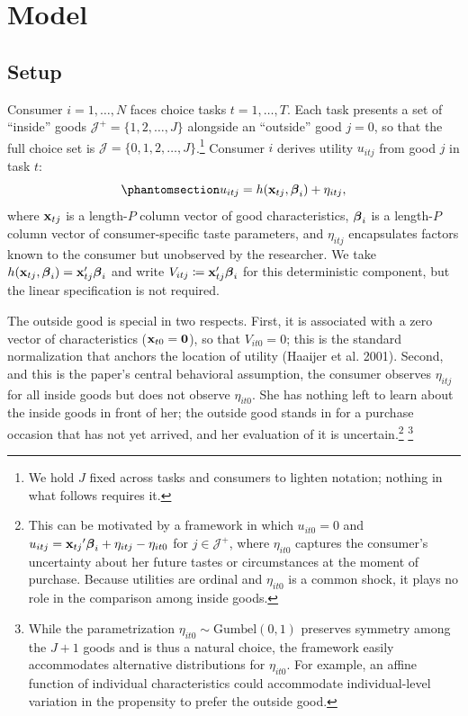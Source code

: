 \documentclass[
  letterpaper,
  DIV=11,
  numbers=noendperiod]{scrartcl}
\theoremstyle{plain}
\theoremstyle{plain}
\theoremstyle{remark}
\begin{document}
\section{Model}\label{sec-model}

\subsection{Setup}\label{setup}

Consumer \(i=1,\ldots,N\) faces choice tasks \(t=1,\ldots,T\). Each task
presents a set of ``inside'' goods
\(\mathcal{J}^{+} = \lbrace 1,2,\ldots,J \rbrace\) alongside an
``outside'' good \(j=0\), so that the full choice set is
\(\mathcal{J} = \lbrace 0,1,2,\ldots,J \rbrace\).\footnote{We hold \(J\)
  fixed across tasks and consumers to lighten notation; nothing in what
  follows requires it.} Consumer \(i\) derives utility \(u_{itj}\) from
good \(j\) in task \(t\):
\begin{equation}\protect\phantomsection\label{eq-utility}{
u_{itj} = h(\x_{tj}, \bfbeta_i) + \eta_{itj},
}\end{equation} where \(\mathbf{x}_{tj}\) is a length-\(P\) column vector of
good characteristics, \(\boldsymbol{\beta}_i\) is a length-\(P\) column vector of
consumer-specific taste parameters, and \(\eta_{itj}\) encapsulates
factors known to the consumer but unobserved by the researcher. We take
\(h(\mathbf{x}_{tj}, \boldsymbol{\beta}_i) = \mathbf{x}_{tj}'\boldsymbol{\beta}_i\) and write
\(V_{itj} \coloneqq \mathbf{x}_{tj}'\boldsymbol{\beta}_i\) for this deterministic
component, but the linear specification is not required.

The outside good is special in two respects. First, it is associated
with a zero vector of characteristics (\(\mathbf{x}_{t0} = \mathbf{0}\)), so
that \(V_{it0}=0\); this is the standard normalization that anchors the
location of utility (Haaijer et al. 2001). Second, and this is the
paper's central behavioral assumption, the consumer observes
\(\eta_{itj}\) for all inside goods but does not observe \(\eta_{it0}\).
She has nothing left to learn about the inside goods in front of her;
the outside good stands in for a purchase occasion that has not yet
arrived, and her evaluation of it is uncertain.\footnote{This can be
  motivated by a framework in which \(u_{it0} = 0\) and
  \(u_{itj} = {\mathbf{x}_{tj}}'\boldsymbol{\beta}_i + \eta_{itj} - \eta_{it0}\) for
  \(j \in \mathcal{J}^{+}\), where \(\eta_{it0}\) captures the
  consumer's uncertainty about her future tastes or circumstances at the
  moment of purchase. Because utilities are ordinal and \(\eta_{it0}\)
  is a common shock, it plays no role in the comparison among inside
  goods.} \footnote{While the parametrization
  \(\eta_{it0} \sim \text{Gumbel}\left(0,1\right)\) preserves symmetry
  among the \(J+1\) goods and is thus a natural choice, the framework
  easily accommodates alternative distributions for \(\eta_{it0}\). For
  example, an affine function of individual characteristics could
  accommodate individual-level variation in the propensity to prefer the
  outside good.}
\end{document}
